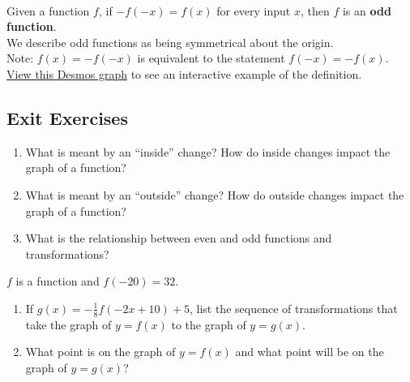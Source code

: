 \begin{myDefinition}~\\[0.5mm]
\begin{minipage}{0.9\linewidth}
Given a function $f$, if $ -f(-x)=f(x)$ for every input $x$, then $f$ is an {\bf odd function}.\\
We describe odd functions as being symmetrical about the origin.\\
Note: $f(x) = -f(-x)$ is equivalent to the statement $f(-x) = -f(x)$.\\[0.4em]
 \href{https://tiny.cc/111Z-OddFunction}{View this Desmos graph} to see an interactive example of the definition. %
\end{minipage}
\begin{minipage}{0.1\linewidth}
\flushright {}
\end{minipage}
\end{myDefinition}





 \newpage

\subsection*{Exit Exercises} \label{exit-functions-transformations}




\begin{myExit}
	\begin{enumerate}
		\item What is meant by an ``inside'' change?  How do inside changes impact the graph of a function?
		\vfill
		\item What is meant by an ``outside'' change?  How do outside changes impact the graph of a function?
		\vfill
		\item What is the relationship between even and odd functions and transformations?
		\vfill
	\end{enumerate}
\end{myExit}


\begin{myExit}
$f$ is a function and $f(-20) = 32$.
	\begin{enumerate}
		\item If $g(x) = -\frac{1}{8} f(-2x+10)+5$, list the sequence of transformations that take the graph of $y=f(x)$ to the graph of $y=g(x)$.
		\vfill
		\vfill
		\item What point is on the graph of $y=f(x)$ and what point will be on the graph of $y=g(x)$?
		\vfill
	\end{enumerate}
\end{myExit}








